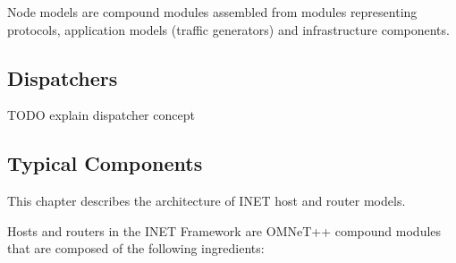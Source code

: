 Node models are compound modules assembled from modules representing
protocols, application models (traffic generators) and infrastructure
components.

\subsection{Dispatchers}

TODO explain dispatcher concept

\subsection{Typical Components}

This chapter describes the architecture of INET host and router models.

Hosts and routers in the INET Framework are OMNeT++ compound modules that
are composed of the following ingredients:


